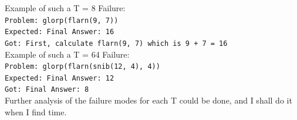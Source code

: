 Example of such a T = 8 Failure: \\
\texttt{Problem: glorp(flarn(9, 7))} \\
\texttt{Expected: Final Answer: 16} \\
\texttt{Got: First, calculate flarn(9, 7) which is 9 + 7 = 16} \\

\vspace{0.5em}
Example of such a T = 64 Failure: \\
\texttt{Problem: glorp(flarn(snib(12, 4), 4))} \\ \texttt{Expected: Final Answer: 12} \\
\texttt{Got: Final Answer: 8} \\

Further analysis of the failure modes for each T could be done, and I shall do it when I find time.